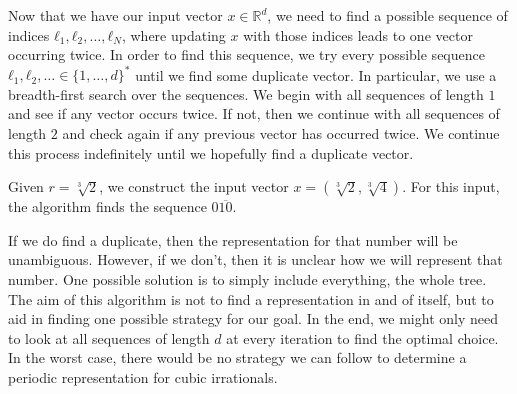 Now that we have our input vector $x ∈ ℝ^d$, we need to find a possible
sequence of indices $ℓ_1, ℓ_2, …, ℓ_N$, where updating $x$ with those
indices leads to one vector occurring twice.
In order to find this sequence, we try every possible sequence
$ℓ_1, ℓ_2, … ∈ \{1, …, d\}^*$ until we find some duplicate vector.
In particular, we use a breadth-first search over the sequences.
We begin with all sequences of length $1$ and see if any vector occurs twice.
If not, then we continue with all sequences of length $2$ and check again if
any previous vector has occurred twice.
We continue this process indefinitely until we hopefully find a duplicate vector.

\begin{example}
  Given $r = \sqrt[3]{2}$, we construct the input vector $x = \left(\sqrt[3]{2}, \sqrt[3]{4}\right)$.
  For this input, the algorithm finds the sequence $0\overline{10}$.

\end{example}



If we do find a duplicate, then the representation for that number will be unambiguous.
However, if we don't, then it is unclear how we will represent that number.
One possible solution is to simply include everything, the whole tree.
The aim of this algorithm is not to find a representation in and of itself,
but to aid in finding one possible strategy for our goal.
In the end, we might only need to look at all sequences of length $d$ at every
iteration to find the optimal choice.
In the worst case, there would be no strategy we can follow to determine a
periodic representation for cubic irrationals.

